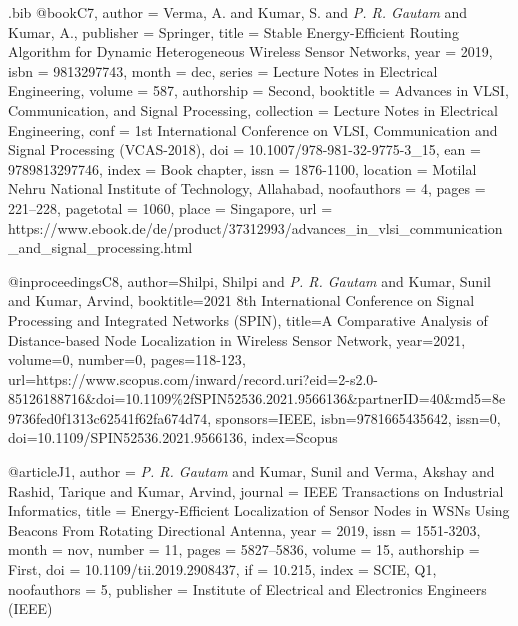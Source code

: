 \begin{filecontents}{\jobname .bib}
@book{C7,
  author      = {Verma, A. and Kumar, S. and \emph{P. R. Gautam} and Kumar, A.},
  publisher   = {Springer},
  title       = {Stable Energy-Efficient Routing Algorithm for Dynamic Heterogeneous Wireless Sensor Networks},
  year        = {2019},
  isbn        = {9813297743},
  month       = dec,
  series      = {Lecture Notes in Electrical Engineering},
  volume      = {587},
  authorship  = {Second},
  booktitle   = {Advances in VLSI, Communication, and Signal Processing},
  collection  = {Lecture Notes in Electrical Engineering},
  conf        = {1st International Conference on VLSI, Communication and Signal Processing (VCAS-2018)},
  doi         = {10.1007/978-981-32-9775-3_15},
  ean         = {9789813297746},
  index       = {Book chapter},
  issn        = {1876-1100},
  location    = {Motilal Nehru National Institute of Technology, Allahabad},
  noofauthors = {4},
  pages       = {221--228},
  pagetotal   = {1060},
  place       = {Singapore},
  url         = {https://www.ebook.de/de/product/37312993/advances_in_vlsi_communication_and_signal_processing.html}
}

@inproceedings{C8,  
author={Shilpi, Shilpi and \emph{P. R. Gautam} and Kumar, Sunil and Kumar, Arvind},  
booktitle={2021 8th International Conference on Signal Processing and Integrated Networks (SPIN)},   title={A Comparative Analysis of Distance-based Node Localization in Wireless Sensor Network},   year={2021},  
volume={0},  
number={0},  
pages={118-123}, 
url={https://www.scopus.com/inward/record.uri?eid=2-s2.0-85126188716\&doi=10.1109\%2fSPIN52536.2021.9566136\&partnerID=40\&md5=8e9736fed0f1313c62541f62fa674d74},
sponsors={IEEE},
isbn={9781665435642},
issn={0},
doi={10.1109/SPIN52536.2021.9566136},
index={Scopus}
}










@article{J1,
  author      = {\emph{P. R. Gautam} and Kumar, Sunil and Verma, Akshay and Rashid, Tarique and Kumar, Arvind},
  journal     = {IEEE Transactions on Industrial Informatics},
  title       = {Energy-Efficient Localization of Sensor Nodes in {WSNs} Using Beacons From Rotating Directional Antenna},
  year        = {2019},
  issn        = {1551-3203},
  month       = {nov},
  number      = {11},
  pages       = {5827--5836},
  volume      = {15},
  authorship  = {First},
  doi         = {10.1109/tii.2019.2908437},
  if          = {10.215},
  index       = {SCIE, Q1},
  noofauthors = {5},
  publisher   = {Institute of Electrical and Electronics Engineers ({IEEE})}
}




\end{filecontents}
